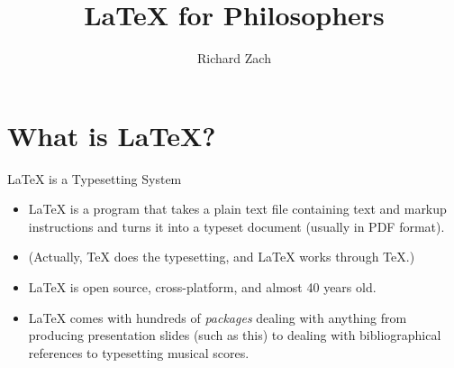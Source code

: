

\usepackage{hyperref,graphicx,verbatim}

\beamersetuncovermixins
  {}%
  {}

\newenvironment{articleonly}{\mode<article>}{\mode<all>}


\title{\LaTeX{} for Philosophers}

\author{Richard Zach}



\frame{\maketitle}


\section{What is \LaTeX?}

\begin{frame}{\LaTeX{} is a Typesetting System}

\begin{itemize}
\item \LaTeX{} is a program that takes a plain text file containing
  text and markup instructions and turns it into a typeset document
  (usually in PDF format).
\item (Actually, \TeX{} does the typesetting, and \LaTeX{} works through \TeX.)
\item \LaTeX{} is open source, cross-platform, and almost 40 years old.
\item \LaTeX{} comes with hundreds of \emph{packages} dealing with
  anything from producing presentation slides (such as this) to
  dealing with bibliographical references to typesetting musical
  scores.
\end{itemize}
\end{frame}

